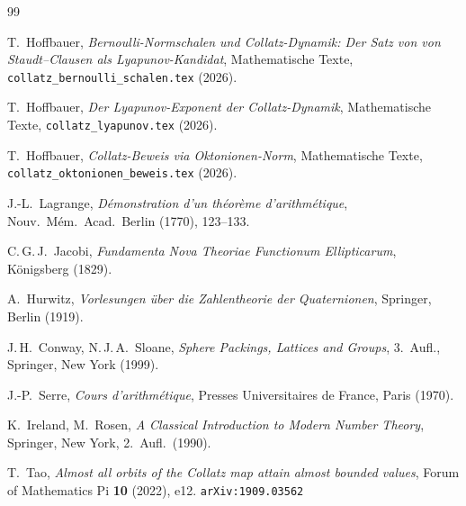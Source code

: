 \documentclass[12pt,a4paper]{article}
\begin{document}
\begin{thebibliography}{99}

T.\ Hoffbauer,
\textit{Bernoulli-Normschalen und Collatz-Dynamik: Der Satz von von Staudt--Clausen
als Lyapunov-Kandidat},
Mathematische Texte, \texttt{collatz\_bernoulli\_schalen.tex} (2026).

T.\ Hoffbauer,
\textit{Der Lyapunov-Exponent der Collatz-Dynamik},
Mathematische Texte, \texttt{collatz\_lyapunov.tex} (2026).

T.\ Hoffbauer,
\textit{Collatz-Beweis via Oktonionen-Norm},
Mathematische Texte, \texttt{collatz\_oktonionen\_beweis.tex} (2026).

J.-L.\ Lagrange,
\textit{Démonstration d'un théorème d'arithmétique},
Nouv.\ Mém.\ Acad.\ Berlin (1770), 123--133.

C.\,G.\,J.\ Jacobi,
\textit{Fundamenta Nova Theoriae Functionum Ellipticarum},
Königsberg (1829).

A.\ Hurwitz,
\textit{Vorlesungen über die Zahlentheorie der Quaternionen},
Springer, Berlin (1919).

J.\,H.\ Conway, N.\,J.\,A.\ Sloane,
\textit{Sphere Packings, Lattices and Groups},
3.\ Aufl., Springer, New York (1999).

J.-P.\ Serre,
\textit{Cours d'arithmétique},
Presses Universitaires de France, Paris (1970).

K.\ Ireland, M.\ Rosen,
\textit{A Classical Introduction to Modern Number Theory},
Springer, New York, 2.\ Aufl.\ (1990).

T.\ Tao,
\textit{Almost all orbits of the Collatz map attain almost bounded values},
Forum of Mathematics Pi \textbf{10} (2022), e12.
\texttt{arXiv:1909.03562}

\end{thebibliography}
\end{document}
